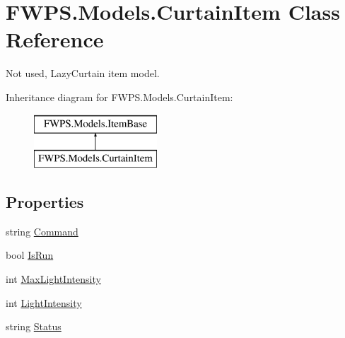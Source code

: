 \hypertarget{class_f_w_p_s_1_1_models_1_1_curtain_item}{}\section{F\+W\+P\+S.\+Models.\+Curtain\+Item Class Reference}
\label{class_f_w_p_s_1_1_models_1_1_curtain_item}


Not used, Lazy\+Curtain item model.  


Inheritance diagram for F\+W\+P\+S.\+Models.\+Curtain\+Item\+:\begin{figure}[H]
\begin{center}
\leavevmode
\includegraphics[height=2.000000cm]{class_f_w_p_s_1_1_models_1_1_curtain_item}
\end{center}
\end{figure}
\subsection*{Properties}
\begin{DoxyCompactItemize}
\item 
string \mbox{\hyperlink{class_f_w_p_s_1_1_models_1_1_curtain_item_ae854245c5f45860f67d12eb23d387fb2}{Command}}
\item 
bool \mbox{\hyperlink{class_f_w_p_s_1_1_models_1_1_curtain_item_a0dea01f4e7591496e083e676f8b86856}{Is\+Run}}
\item 
int \mbox{\hyperlink{class_f_w_p_s_1_1_models_1_1_curtain_item_a4322d54d202d23455973b27c675ab337}{Max\+Light\+Intensity}}
\item 
int \mbox{\hyperlink{class_f_w_p_s_1_1_models_1_1_curtain_item_ade98275184b2b1cf596d1c3235f4c36a}{Light\+Intensity}}
\item 
string \mbox{\hyperlink{class_f_w_p_s_1_1_models_1_1_curtain_item_aa50a9ef424bb7301d884a8a3fb9e5824}{Status}}
\end{DoxyCompactItemize}
